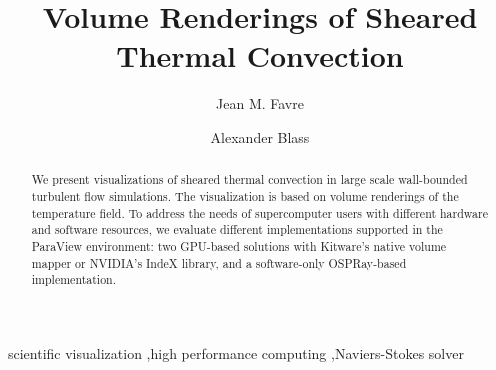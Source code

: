 \documentclass[final,5p,times,twocolumn]{elsarticle}
\begin{document}
\begin{frontmatter}



\title{Volume Renderings of Sheared Thermal Convection}


\author[CSCS]{Jean M. Favre}
\author[Twente]{Alexander Blass}

\address[CSCS]{Swiss National Supercomputing Center (CSCS), Via Trevano 131, CH-6900 Lugano, Switzerland}
\address[Twente]{Physics of Fluids Group, Max Planck Center for Complex Fluid Dynamics,
J. M. Burgers Center for Fluid Dynamics and MESA+ Research Institute,
Department of Science and Technology,
University of Twente, P.O. Box 217, 7500 AE Enschede, The Netherlands}

\begin{abstract}

We present visualizations of sheared thermal convection in large scale
wall-bounded turbulent flow simulations. The visualization is based on volume
renderings of the temperature field. To address the needs of supercomputer users
with different hardware and software resources, we evaluate different implementations
supported in the ParaView\cite{Ahrens2005} environment: two GPU-based solutions
with Kitware's native volume mapper or NVIDIA's IndeX library, and a software-only
OSPRay-based implementation.

\end{abstract}

\begin{keyword}

scientific visualization \sep high performance computing \sep Naviers-Stokes solver

\end{keyword}

\end{frontmatter}
\end{document}
